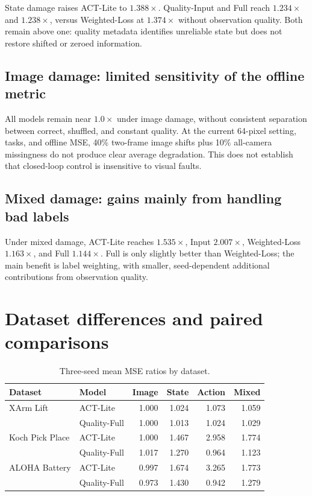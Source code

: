 \documentclass[11pt,a4paper]{article}
\begin{document}
State damage raises ACT-Lite to $1.388\times$. Quality-Input and Full reach $1.234\times$ and $1.238\times$, versus Weighted-Loss at $1.374\times$ without observation quality. Both remain above one: quality metadata identifies unreliable state but does not restore shifted or zeroed information.

\subsection{Image damage: limited sensitivity of the offline metric}

All models remain near $1.0\times$ under image damage, without consistent separation between correct, shuffled, and constant quality. At the current 64-pixel setting, tasks, and offline MSE, 40\% two-frame image shifts plus 10\% all-camera missingness do not produce clear average degradation. This does not establish that closed-loop control is insensitive to visual faults.

\subsection{Mixed damage: gains mainly from handling bad labels}

Under mixed damage, ACT-Lite reaches $1.535\times$, Input $2.007\times$, Weighted-Loss $1.163\times$, and Full $1.144\times$. Full is only slightly better than Weighted-Loss; the main benefit is label weighting, with smaller, seed-dependent additional contributions from observation quality.

\clearpage\section{Dataset differences and paired comparisons}

\begin{table}[H]
\centering
\scriptsize
\begin{tabular}{p{32mm}p{31mm}rrrr}
\toprule
Dataset & Model & Image & State & Action & Mixed\\
\midrule
XArm Lift & ACT-Lite & 1.000 & 1.024 & 1.073 & 1.059\\
 & Quality-Full & 1.000 & 1.013 & 1.024 & 1.029\\
Koch Pick Place & ACT-Lite & 1.000 & 1.467 & 2.958 & 1.774\\
 & Quality-Full & 1.017 & 1.270 & 0.964 & 1.123\\
ALOHA Battery & ACT-Lite & 0.997 & 1.674 & 3.265 & 1.773\\
 & Quality-Full & 0.973 & 1.430 & 0.942 & 1.279\\
\bottomrule
\end{tabular}
\caption{Three-seed mean MSE ratios by dataset.}
\end{table}
\end{document}
